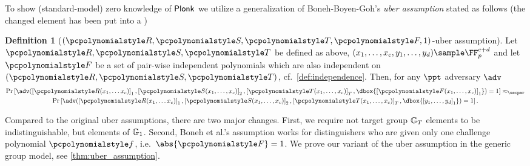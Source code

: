 \documentclass[runningheads,11pt]{llncs}
\theoremstyle{definition} \newtheorem{definition}[theorem]{Definition}
\newcommand\dboxed[1]{\dbox{\ensuremath{#1}}}
\begin{document}
To show (standard-model) zero knowledge of $\textnormal{\textsf{Plonk}}$ we utilize a generalization
of Boneh-Boyen-Goh's \emph{uber assumption} \cite{EC:BonBoyGoh05} stated as
follows (the changed element has been put into a )
\begin{definition}[$(\pR, \pS, \pT, \p{F}, 1)$-uber assumption]
	\label{def:uber_assumption}
	Let $\pR, \pS, \pT$ be defined as above,
    $(x_1, \ldots, x_c, y_1, \ldots, y_{d}) \sample \FF_p^{c + d}$ and let
    $\p{F}$ be a set of pair-wise independent polynomials which are also
    independent on $(\pR, \pS, \pT)$, cf.~\cref{def:independence}.  Then, for
    any $\ppt$ adversary $\adv$
	\begin{multline*}
      \Pr\left[\adv(\gone{\pR(x_1, \ldots x_c)}, \gtwo{\pS(x_1, \ldots, x_c)},
		\gtar{\pT(x_1, \ldots, x_c)}, \dboxed{\gone{\p{F}(x_1, \ldots, x_c)}}) = 1\right] \approx_\secpar \\
      \Pr\left[\adv(\gone{\pR(x_1, \ldots x_c)}, \gtwo{\pS(x_1, \ldots, x_c)},
        \gtar{\pT(x_1, \ldots, x_c)}, \dboxed{\gone{y_1, \ldots, y_{d}}}) =
        1\right].
	\end{multline*}
  \end{definition}

  Compared to the original uber assumptions, there are two major changes. First,
  we require not target group $\mathbb{G}_T$ elements to be indistinguishable, but
  elements of $\mathbb{G}_1$. Second, Boneh et al.'s assumption works for
  distinguishers who are given only one challenge polynomial $\p{f}$,
  i.e.~$\abs{\p{F}} = 1$.  We prove our variant of the uber assumption in the
  generic group model, see \cref{thm:uber_assumption}.
\end{document}
